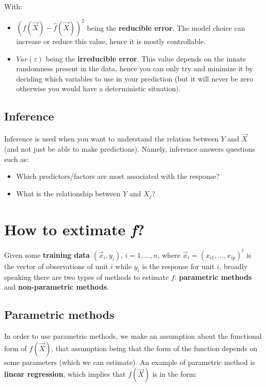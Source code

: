       With:
      \begin{itemize}
        \item $(f(\vec{X}) - \hat{f}(\vec{X}))^2$ being the \textbf{reducible error}. The model choice can increase or reduce this value, hence it is mostly controllable.
        \item $Var(\varepsilon)$ being the \textbf{irreducible error}. This value depends on the innate randomness present in the data, hence you can only try and minimize it by deciding which variables to use in your prediction (but it will never be zero otherwise you would have a deterministic situation).
      \end{itemize}


    \subsection{Inference}
      Inference is used when you want to understand the relation between $Y$ and $\vec{X}$ (and not just be able to make predictions). Namely, inference answers questions such as:
      \begin{itemize}
        \item Which predictors/factors are most associated with the response?
        \item What is the relationship between $Y$ and $X_j$?
      \end{itemize}

  \section{How to extimate \textit{f}?}
    Given some \textbf{training data} $(\vec{x}_i, y_i), \, i = 1, \dots, n$, where $\vec{x}_i = (x_{i1}, \dots, x_{ip})^t$ is the vector of observations of unit $i$ while $y_i$ is the response for unit $i$, broadly speaking there are two types of methods to estimate $f$: \textbf{parametric methods} and \textbf{non-parametric methods}.

    \subsection{Parametric methods}
      In order to use parametric methods, we make an assumption about the functional form of $f(\vec{X})$, that assumption being that the form of the function depends on some parameters (which we can estimate). An example of parametric method is \textbf{linear regression}, which implies that $f(\vec{X})$ is in the form:


